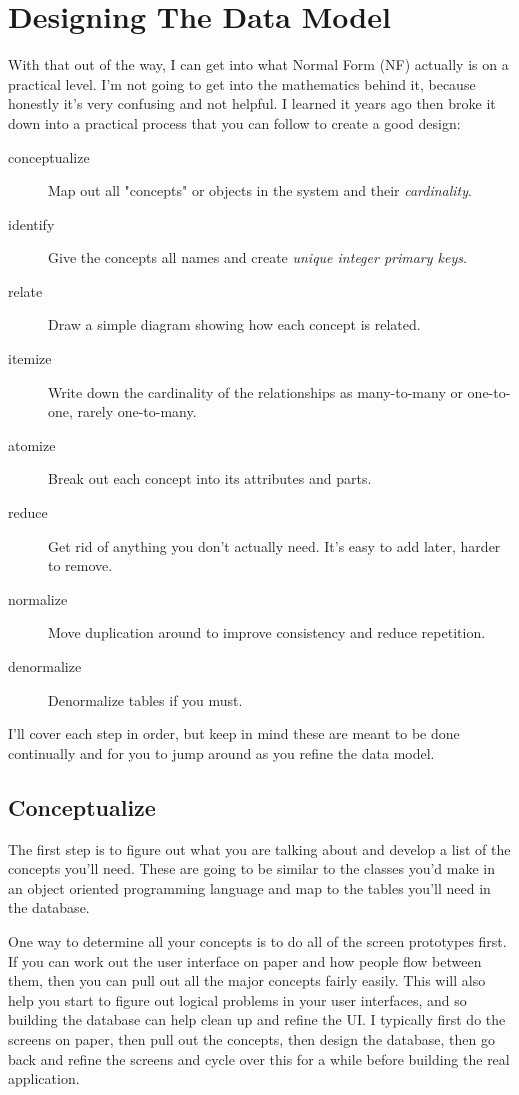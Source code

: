 \section{Designing The Data Model}

With that out of the way, I can get into what Normal Form (NF) actually is on a practical
level.  I'm not going to get into the mathematics behind it, because honestly it's very
confusing and not helpful.  I learned it years ago then broke it down into a practical
process that you can follow to create a good design:

\begin{description}
\item[conceptualize] Map out all "concepts" or objects in the system and their \emph{cardinality}.
\item[identify] Give the concepts all names and create \emph{unique integer primary keys}.
\item[relate] Draw a simple diagram showing how each concept is related.
\item[itemize] Write down the cardinality of the relationships as many-to-many or one-to-one, rarely one-to-many.
\item[atomize] Break out each concept into its attributes and parts.
\item[reduce] Get rid of anything you don't actually need.  It's easy to add later, harder to remove.
\item[normalize] Move duplication around to improve consistency and reduce repetition.
\item[denormalize] Denormalize tables if you must.
\end{description}

I'll cover each step in order, but keep in mind these are meant to be done continually and for you
to jump around as you refine the data model.

\subsection{Conceptualize}

The first step is to figure out what you are talking about and develop a list of the concepts you'll
need.  These are going to be similar to the classes you'd make in an object oriented programming
language and map to the tables you'll need in the database.

One way to determine all your concepts is to do all of the screen prototypes first.  If you can
work out the user interface on paper and how people flow between them, then you can pull out
all the major concepts fairly easily.  This will also help you start to figure out logical
problems in your user interfaces, and so building the database can help clean up and refine
the UI.  I typically first do the screens on paper, then pull out the concepts, then design
the database, then go back and refine the screens and cycle over this for a while before
building the real application.

